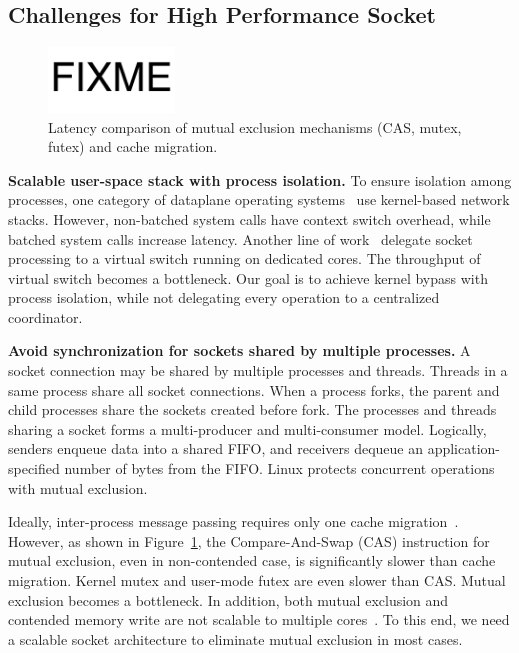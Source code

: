 \subsection{Challenges for High Performance Socket}
\label{subsec:challenges}

\begin{figure}[t]
	\centering
	\includegraphics[width=0.3\textwidth]{images/fixme}
	\caption{Latency comparison of mutual exclusion mechanisms (CAS, mutex, futex) and cache migration.}
	\label{fig:mutual-exclusion}
\end{figure}

\textbf{Scalable user-space stack with process isolation.}
To ensure isolation among processes, one category of dataplane operating systems~\cite{belay2014ix,tsai2017lite} use kernel-based network stacks. However, non-batched system calls have context switch overhead, while batched system calls increase latency. Another line of work~\cite{martins2014clickos,roghanchi2017ffwd,huang2017high} delegate socket processing to a virtual switch running on dedicated cores. The throughput of virtual switch becomes a bottleneck. Our goal is to achieve kernel bypass with process isolation, while not delegating every operation to a centralized coordinator.

\textbf{Avoid synchronization for sockets shared by multiple processes.}
A socket connection may be shared by multiple processes and threads. Threads in a same process share all socket connections. When a process forks, the parent and child processes share the sockets created before fork. The processes and threads sharing a socket forms a multi-producer and multi-consumer model. Logically, senders enqueue data into a shared FIFO, and receivers dequeue an application-specified number of bytes from the FIFO. Linux protects concurrent operations with mutual exclusion.

Ideally, inter-process message passing requires only one cache migration~\cite{roghanchi2017ffwd}. However, as shown in Figure~\ref{fig:mutual-exclusion}, the Compare-And-Swap (CAS) instruction for mutual exclusion, even in non-contended case, is significantly slower than cache migration. Kernel mutex and user-mode futex are even slower than CAS. Mutual exclusion becomes a bottleneck. In addition, both mutual exclusion and contended memory write are not scalable to multiple cores~\cite{boyd2014optimizing}. To this end, we need a scalable socket architecture to eliminate mutual exclusion in most cases.

